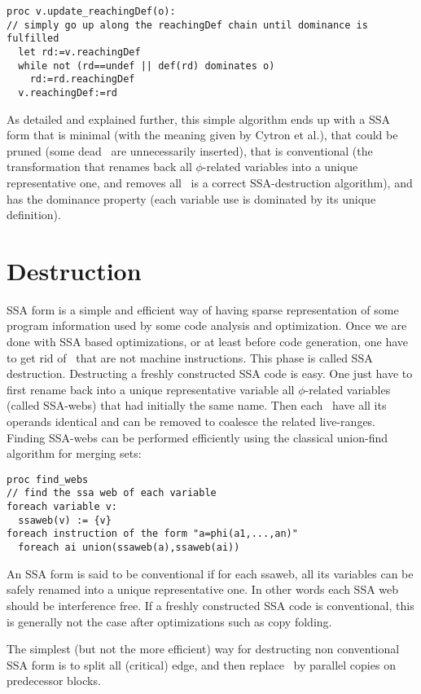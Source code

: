 \begin{verbatim}
proc v.update_reachingDef(o):
// simply go up along the reachingDef chain until dominance is fulfilled 
  let rd:=v.reachingDef
  while not (rd==undef || def(rd) dominates o)
    rd:=rd.reachingDef
  v.reachingDef:=rd
\end{verbatim}

As detailed and explained further, this simple algorithm ends up with a SSA form that is minimal (with the meaning given by Cytron et al.), that could be pruned (some dead \phiops\ are unnecessarily inserted), that is conventional (the transformation that renames back all $\phi$-related variables into a unique representative one, and removes all \phiops\ is a correct SSA-destruction algorithm), and has the dominance property (each variable use is dominated by its unique definition).
\section{Destruction }
\label{sec:classical_destruction}

SSA form is a simple and efficient way of having sparse representation of some program information used by some code analysis and optimization. Once we are done with SSA based optimizations, or at least before code generation, one have to get rid of \phiops\ that are not machine instructions. This phase is called SSA destruction. 
Destructing a freshly constructed SSA code is easy. One just have to first rename back into a unique representative variable all $\phi$-related variables (called SSA-webs) that had initially the same name. Then each \phiop\ have all its operands identical and can be removed to coalesce the related live-ranges.
Finding SSA-webs can be performed efficiently using the classical union-find algorithm for merging sets:
\begin{verbatim}
proc find_webs
// find the ssa web of each variable
foreach variable v:
  ssaweb(v) := {v}
foreach instruction of the form "a=phi(a1,...,an)"
  foreach ai union(ssaweb(a),ssaweb(ai))
\end{verbatim}

An SSA form is said to be conventional if for each ssaweb, all its variables can be safely renamed into a unique representative one. In other words each SSA web should be interference free. If a freshly constructed SSA code is conventional, this is generally not the case after optimizations such as copy folding.

The simplest (but not the more efficient) way for destructing non conventional SSA form is to split all (critical) edge, and then replace \phiops\ by parallel copies on predecessor blocks. 


